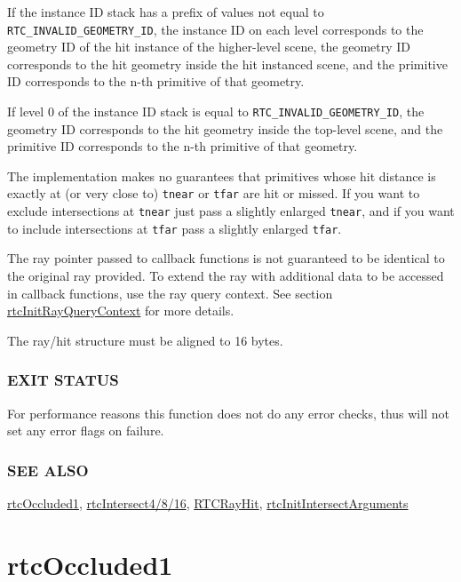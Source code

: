 If the instance ID stack has a prefix of values not equal to
\texttt{RTC\_INVALID\_GEOMETRY\_ID}, the instance ID on each level
corresponds to the geometry ID of the hit instance of the higher-level
scene, the geometry ID corresponds to the hit geometry inside the hit
instanced scene, and the primitive ID corresponds to the n-th primitive
of that geometry.

If level 0 of the instance ID stack is equal to
\texttt{RTC\_INVALID\_GEOMETRY\_ID}, the geometry ID corresponds to the
hit geometry inside the top-level scene, and the primitive ID
corresponds to the n-th primitive of that geometry.

The implementation makes no guarantees that primitives whose hit
distance is exactly at (or very close to) \texttt{tnear} or
\texttt{tfar} are hit or missed. If you want to exclude intersections at
\texttt{tnear} just pass a slightly enlarged \texttt{tnear}, and if you
want to include intersections at \texttt{tfar} pass a slightly enlarged
\texttt{tfar}.

The ray pointer passed to callback functions is not guaranteed to be
identical to the original ray provided. To extend the ray with
additional data to be accessed in callback functions, use the ray query
context. See section
\hyperref[rtcinitrayquerycontext]{rtcInitRayQueryContext} for more
details.

The ray/hit structure must be aligned to 16 bytes.

\subsubsection{EXIT STATUS}\label{exit-status}

For performance reasons this function does not do any error checks, thus
will not set any error flags on failure.

\subsubsection{SEE ALSO}\label{see-also}

\hyperref[rtcoccluded1]{rtcOccluded1},
\hyperref[rtcintersect4816]{rtcIntersect4/8/16},
\hyperref[rtcrayhit]{RTCRayHit},
\hyperref[rtcinitintersectarguments]{rtcInitIntersectArguments}

\pagebreak

\section{rtcOccluded1}\label{rtcoccluded1}

